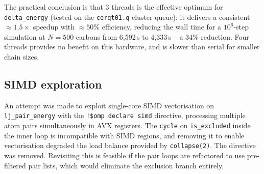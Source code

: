 The practical conclusion is that 3 threads is the effective optimum
for \texttt{delta\_energy} (tested on the \texttt{cerqt01.q} cluster queue):
it delivers a consistent ${\approx}1.5\times$ speedup with
${\approx}50\%$ efficiency, reducing the wall time for a $10^6$-step
simulation at $N = 500$ carbons from 6{,}592\,s to 4{,}333\,s -- a
34\% reduction. Four threads provides no benefit on this hardware,
and is slower than serial for smaller chain sizes.

\subsection{SIMD exploration}
 
An attempt was made to exploit single-core SIMD vectorisation on
\texttt{lj\_pair\_energy} with the \texttt{!\$omp declare simd}
directive, processing multiple atom pairs simultaneously in AVX
registers. The \texttt{cycle} on \texttt{is\_excluded} inside the
inner loop is incompatible with SIMD regions, and removing it to
enable vectorisation degraded the load balance provided by
\texttt{collapse(2)}. The directive was removed. Revisiting this is
feasible if the pair loops are refactored to use pre-filtered pair
lists, which would eliminate the exclusion branch entirely.
